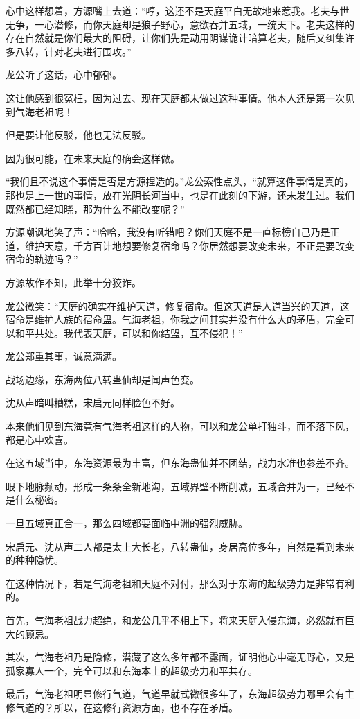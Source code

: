 \begin{this_body}
心中这样想着，方源嘴上去道：“哼，这还不是天庭平白无故地来惹我。老夫与世无争，一心潜修，而你天庭却是狼子野心，意欲吞并五域，一统天下。老夫这样的存在自然就是你们最大的阻碍，让你们先是动用阴谋诡计暗算老夫，随后又纠集许多八转，针对老夫进行围攻。”

龙公听了这话，心中郁郁。

这让他感到很冤枉，因为过去、现在天庭都未做过这种事情。他本人还是第一次见到气海老祖呢！

但是要让他反驳，他也无法反驳。

因为很可能，在未来天庭的确会这样做。

“我们且不说这个事情是否是方源捏造的。”龙公索性点头，“就算这件事情是真的，那也是上一世的事情，放在光阴长河当中，也是在此刻的下游，还未发生过。我们既然都已经知晓，那为什么不能改变呢？”

方源嘲讽地笑了声：“哈哈，我没有听错吧？你们天庭不是一直标榜自己乃是正道，维护天意，千方百计地想要修复宿命吗？你居然想要改变未来，不正是要改变宿命的轨迹吗？”

方源故作不知，此举十分狡诈。

龙公微笑：“天庭的确实在维护天道，修复宿命。但这天道是人道当兴的天道，这宿命是维护人族的宿命蛊。气海老祖，你我之间其实并没有什么大的矛盾，完全可以和平共处。我代表天庭，可以和你结盟，互不侵犯！”

龙公郑重其事，诚意满满。

战场边缘，东海两位八转蛊仙却是闻声色变。

沈从声暗叫糟糕，宋启元同样脸色不好。

本来他们见到东海竟有气海老祖这样的人物，可以和龙公单打独斗，而不落下风，都是心中欢喜。

在这五域当中，东海资源最为丰富，但东海蛊仙并不团结，战力水准也参差不齐。

眼下地脉频动，形成一条条全新地沟，五域界壁不断削减，五域合并为一，已经不是什么秘密。

一旦五域真正合一，那么四域都要面临中洲的强烈威胁。

宋启元、沈从声二人都是太上大长老，八转蛊仙，身居高位多年，自然是看到未来的种种隐忧。

在这种情况下，若是气海老祖和天庭不对付，那么对于东海的超级势力是非常有利的。

首先，气海老祖战力超绝，和龙公几乎不相上下，将来天庭入侵东海，必然就有巨大的顾忌。

其次，气海老祖乃是隐修，潜藏了这么多年都不露面，证明他心中毫无野心，又是孤家寡人一个，完全可以和东海本土的超级势力和平共存。

最后，气海老祖明显修行气道，气道早就式微很多年了，东海超级势力哪里会有主修气道的？所以，在这修行资源方面，也不存在矛盾。


\end{this_body}
